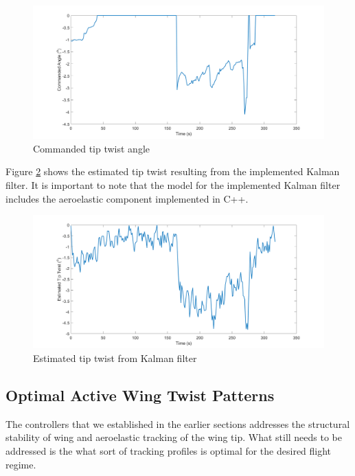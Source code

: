 \documentclass[11pt]{ucthesis}
\begin{document}
\begin{figure}[thpb]
\centering
\includegraphics[width=1\linewidth]{Figures/CommandedTwist.png}
\caption{Commanded tip twist angle}
\label{fig:AHilSimCMD}
\end{figure}

Figure \ref{fig:AHilSimKal} shows the estimated tip twist resulting from the implemented Kalman filter. It is important to note that the model for the implemented Kalman filter includes the aeroelastic component implemented in C++.

\begin{figure}[thpb]
\centering
\includegraphics[width=1\linewidth]{Figures/EstimatedTipTwist.png}
\caption{Estimated tip twist from Kalman filter}
\label{fig:AHilSimKal}
\end{figure}

\subsection{Optimal Active Wing Twist Patterns}
The controllers that we established in the earlier sections addresses the structural stability of wing and aeroelastic tracking of the wing tip. What still needs to be addressed is the what sort of tracking profiles is optimal for the desired flight regime.
\end{document}
